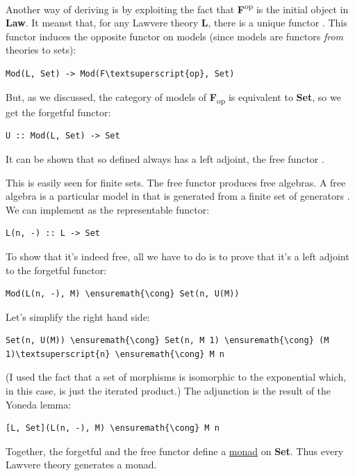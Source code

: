 Another way of deriving  is by exploiting the fact that
\textbf{F}\textsuperscript{op} is the initial object in \textbf{Law}. It
meanst that, for any Lawvere theory \textbf{L}, there is a unique
functor . This functor induces the
opposite functor on models (since models are functors \emph{from}
theories to sets):

\begin{Verbatim}[commandchars=\\\{\}]
Mod(L, Set) -> Mod(F\textsuperscript{op}, Set)
\end{Verbatim}
But, as we discussed, the category of models of
\textbf{F}\textsubscript{op} is equivalent to \textbf{Set}, so we get
the forgetful functor:

\begin{Verbatim}[commandchars=\\\{\}]
U :: Mod(L, Set) -> Set
\end{Verbatim}
It can be shown that so defined  always has a left adjoint,
the free functor .

This is easily seen for finite sets. The free functor 
produces free algebras. A free algebra is a particular model in
 that is generated from a finite set of generators
. We can implement  as the representable functor:

\begin{Verbatim}[commandchars=\\\{\}]
L(n, -) :: L -> Set
\end{Verbatim}
To show that it's indeed free, all we have to do is to prove that it's a
left adjoint to the forgetful functor:

\begin{Verbatim}[commandchars=\\\{\}]
Mod(L(n, -), M) \ensuremath{\cong} Set(n, U(M))
\end{Verbatim}
Let's simplify the right hand side:

\begin{Verbatim}[commandchars=\\\{\}]
Set(n, U(M)) \ensuremath{\cong} Set(n, M 1) \ensuremath{\cong} (M 1)\textsuperscript{n} \ensuremath{\cong} M n
\end{Verbatim}
(I used the fact that a set of morphisms is isomorphic to the
exponential which, in this case, is just the iterated product.) The
adjunction is the result of the Yoneda lemma:

\begin{Verbatim}[commandchars=\\\{\}]
[L, Set](L(n, -), M) \ensuremath{\cong} M n
\end{Verbatim}
Together, the forgetful and the free functor define a
\hyperref[monads-categorically]{monad}
 on \textbf{Set}. Thus every Lawvere theory generates
a monad.

